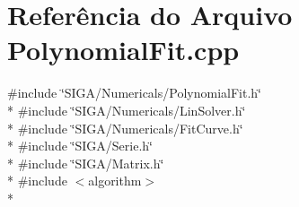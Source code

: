 \section{Referência do Arquivo Polynomial\+Fit.\+cpp}
\label{_polynomial_fit_8cpp}
{\ttfamily \#include \char`\"{}S\+I\+G\+A/\+Numericals/\+Polynomial\+Fit.\+h\char`\"{}}\\*
{\ttfamily \#include \char`\"{}S\+I\+G\+A/\+Numericals/\+Lin\+Solver.\+h\char`\"{}}\\*
{\ttfamily \#include \char`\"{}S\+I\+G\+A/\+Numericals/\+Fit\+Curve.\+h\char`\"{}}\\*
{\ttfamily \#include \char`\"{}S\+I\+G\+A/\+Serie.\+h\char`\"{}}\\*
{\ttfamily \#include \char`\"{}S\+I\+G\+A/\+Matrix.\+h\char`\"{}}\\*
{\ttfamily \#include $<$algorithm$>$}\\*
